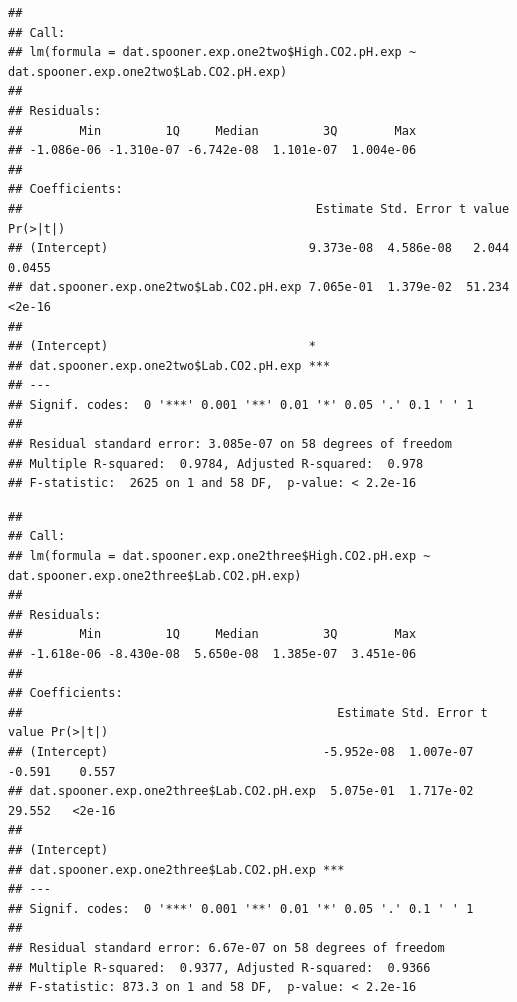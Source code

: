 \documentclass[]{article}
\newenvironment{Shaded}{\begin{snugshade}}{\end{snugshade}}
\newcommand{\KeywordTok}[1]{\textcolor[rgb]{0.13,0.29,0.53}{\textbf{#1}}}
\newcommand{\NormalTok}[1]{#1}
\newcommand{\OperatorTok}[1]{\textcolor[rgb]{0.81,0.36,0.00}{\textbf{#1}}}
\newcommand{\StringTok}[1]{\textcolor[rgb]{0.31,0.60,0.02}{#1}}
\begin{document}
\begin{verbatim}
## 
## Call:
## lm(formula = dat.spooner.exp.one2two$High.CO2.pH.exp ~ dat.spooner.exp.one2two$Lab.CO2.pH.exp)
## 
## Residuals:
##        Min         1Q     Median         3Q        Max 
## -1.086e-06 -1.310e-07 -6.742e-08  1.101e-07  1.004e-06 
## 
## Coefficients:
##                                         Estimate Std. Error t value Pr(>|t|)
## (Intercept)                            9.373e-08  4.586e-08   2.044   0.0455
## dat.spooner.exp.one2two$Lab.CO2.pH.exp 7.065e-01  1.379e-02  51.234   <2e-16
##                                           
## (Intercept)                            *  
## dat.spooner.exp.one2two$Lab.CO2.pH.exp ***
## ---
## Signif. codes:  0 '***' 0.001 '**' 0.01 '*' 0.05 '.' 0.1 ' ' 1
## 
## Residual standard error: 3.085e-07 on 58 degrees of freedom
## Multiple R-squared:  0.9784, Adjusted R-squared:  0.978 
## F-statistic:  2625 on 1 and 58 DF,  p-value: < 2.2e-16
\end{verbatim}

\begin{Shaded}
\end{Shaded}

\begin{verbatim}
## 
## Call:
## lm(formula = dat.spooner.exp.one2three$High.CO2.pH.exp ~ dat.spooner.exp.one2three$Lab.CO2.pH.exp)
## 
## Residuals:
##        Min         1Q     Median         3Q        Max 
## -1.618e-06 -8.430e-08  5.650e-08  1.385e-07  3.451e-06 
## 
## Coefficients:
##                                            Estimate Std. Error t value Pr(>|t|)
## (Intercept)                              -5.952e-08  1.007e-07  -0.591    0.557
## dat.spooner.exp.one2three$Lab.CO2.pH.exp  5.075e-01  1.717e-02  29.552   <2e-16
##                                             
## (Intercept)                                 
## dat.spooner.exp.one2three$Lab.CO2.pH.exp ***
## ---
## Signif. codes:  0 '***' 0.001 '**' 0.01 '*' 0.05 '.' 0.1 ' ' 1
## 
## Residual standard error: 6.67e-07 on 58 degrees of freedom
## Multiple R-squared:  0.9377, Adjusted R-squared:  0.9366 
## F-statistic: 873.3 on 1 and 58 DF,  p-value: < 2.2e-16
\end{verbatim}
\end{document}
